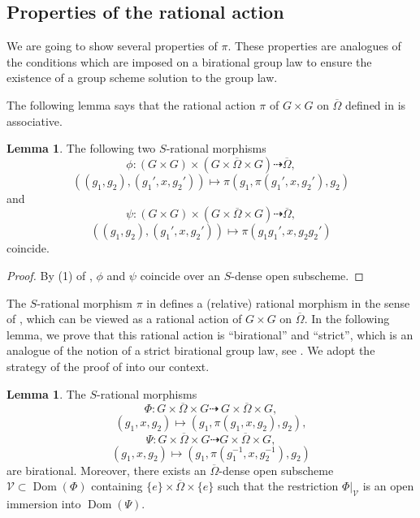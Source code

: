 \documentclass[11pt, reqno]{amsart}
\theoremstyle{plain}
\theoremstyle{definition}
\newtheorem{lemma}[theorem]{Lemma}
\DeclareMathOperator{\Dom}{Dom} %
\begin{document}
\subsection{Properties of the rational action}
We are going to show several properties of $\pi$. These properties are analogues of the conditions which are imposed on a birational group law to ensure the existence of a group scheme solution to the group law.


The following lemma says that the rational action $\pi$ of $ G\times G$ on $\overline{\Omega}$ defined in   is associative.

\begin{lemma}\label{associativity}
    The following two $S$-rational morphisms
    $$\phi\colon(G\times G)\times(G\times\overline{\Omega}\times G)\dashrightarrow \overline{\Omega},$$
    $$((g_1,g_2),(g_1', x, g_2'))\mapsto\pi(g_1, \pi(g_1', x, g_2'),g_2)$$
    and 
    $$\psi\colon(G\times G)\times(G\times\overline{\Omega}\times G)\dashrightarrow \overline{\Omega},$$
    $$((g_1,g_2),(g_1', x, g_2'))\mapsto \pi(g_1g_1', x, g_2 g_2')$$
    coincide.
\end{lemma}

\begin{proof}
    By (1) of , $\phi$ and $\psi$ coincide over an $S$-dense open subscheme.
\end{proof}

The $S$-rational morphism $\pi$ in  defines a (relative) rational morphism in the sense of \cite[exposé~XVIII, définition~1.5]{SGA3II}, which can be viewed as a rational action of $ G\times G$ on $\overline{\Omega}$. In the following lemma, we prove that this rational action is ``birational'' and ``strict'', which is an analogue of the notion of a strict birational group law, see \cite[Chapter~5, Section~5.2, Definition~1]{BLR}. We adopt the strategy of the proof of \cite[Section~6, Proposition~6.3.13]{redctiveconrad} into our context.

\begin{lemma}\label{strictness}
    The $S$-rational morphisms
    $$\Phi\colon  G\times \overline{\Omega}\times G\dashrightarrow
    \ G\times \overline{\Omega}\times G,$$
    $$(g_1, x, g_2)\mapsto(g_1, \pi(g_1, x, g_2), g_2),$$
    $$\Psi\colon  G\times \overline{\Omega}\times G\dashrightarrow
     G\times \overline{\Omega}\times G,$$
    $$(g_1, x, g_2)\mapsto(g_1, \pi(g_1^{-1}, x, g_2^{-1}), g_2)$$
    are birational. Moreover, there exists an $\overline{\Omega}$-dense open subscheme $\mathcal{V}\subset \Dom(\Phi)$ containing $\{e\}\times\overline{\Omega}\times\{e\}$ such that the restriction $\Phi\vert_{\mathcal{V}}$ is an open immersion into $ \Dom(\Psi)$.
\end{lemma}
\end{document}
